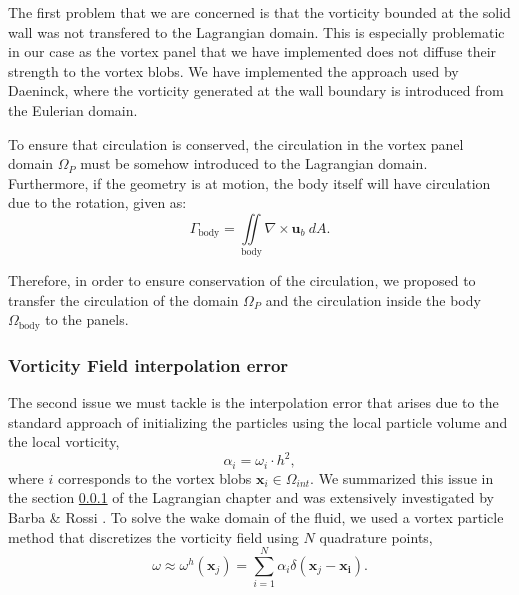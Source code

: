 

The first problem that we are concerned is that the vorticity bounded at the solid wall was not transfered to the Lagrangian domain. This is especially problematic in our case as the vortex panel that we have implemented does not diffuse their strength to the vortex blobs. We have implemented the approach used by Daeninck, where the vorticity generated at the wall boundary is introduced from the Eulerian domain. 

To ensure that circulation is conserved, the circulation in the vortex panel domain $\Omega_P$ must be somehow introduced to the Lagrangian domain. Furthermore, if the geometry is at motion, the body itself will have circulation due to the rotation, given as:
	\begin{equation}
	\Gamma_{\mathrm{body}} = \iint\limits_{\mathrm{body}} \nabla \times \mathbf{u}_b \ d A.
	\end{equation}

Therefore, in order to ensure conservation of the circulation, we proposed to transfer the circulation of the domain $\Omega_P$ and the circulation inside the body $\Omega_{\mathrm{body}}$ to the panels.


\subsubsection{Vorticity Field interpolation error}
	
The second issue we must tackle is the interpolation error that arises due to the standard approach of initializing the particles using the local particle volume and the local vorticity,
	\begin{equation}
	\alpha_i = \omega_i\cdot{h^2},
	\end{equation}
where $i$ corresponds to the vortex blobs $\mathbf{x}_i \in \Omega_{int}$. We summarized this issue in the section \ref{} of the Lagrangian chapter and was extensively investigated by Barba \& Rossi \cite{Barba2010a}. To solve the wake domain of the fluid, we used a vortex particle method that discretizes the vorticity field using $N$ quadrature points,
\begin{equation}
\omega \approx \omega^h(\mathbf{x}_j) = \sum_{i=1}^N \alpha_i \delta(\mathbf{x}_j - \mathbf{x_i}).
\end{equation}

